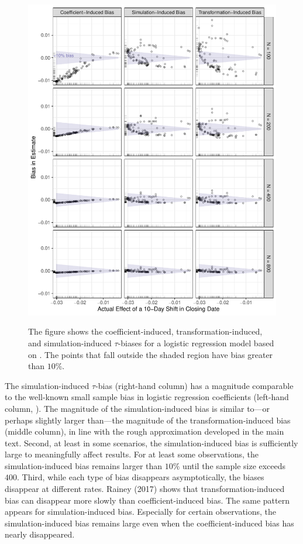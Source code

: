 \documentclass[12pt]{article}
\begin{document}
\begin{figure}[h!]
\begin{center}
\includegraphics[scale = 0.95]{figs/nagler-fd-bias.pdf}\\
\vspace{.1in}
\caption{The figure shows the coefficient-induced, transformation-induced, and simulation-induced $\tau$-biases for a logistic regression model based on \cite{BerryDeMerittEsarey2010}.
The points that fall outside the shaded region have bias greater than $10\%$.}\label{fig:nagler}
\end{center}
\end{figure}

The simulation-induced $\tau$-bias (right-hand column) has a magnitude comparable to the well-known small sample bias in logistic regression coefficients (left-hand column, \citealt{Rainey2021}). The magnitude of the simulation-induced bias is similar to---or perhaps slightly larger than---the magnitude of the transformation-induced bias (middle column), in line with the rough approximation developed in the main text. Second, at least in some scenarios, the simulation-induced bias is sufficiently large to meaningfully affect results. For at least some observations, the simulation-induced bias remains larger than $10\%$ until the sample size exceeds $400$. Third, while each type of bias disappears asymptotically, the biases disappear at different rates. Rainey (2017) shows that transformation-induced bias can disappear more slowly than coefficient-induced bias. The same pattern appears for simulation-induced bias. Especially for certain observations, the simulation-induced bias remains large even when the coefficient-induced bias has nearly disappeared. 
\end{document}
